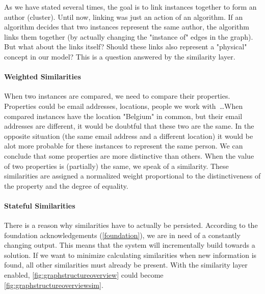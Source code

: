 As we have stated several times, the goal is to link instances together to form an author (cluster). Until now, linking was just an action of an algorithm. If an algorithm decides that two instances represent the same author, the algorithm links them together (by actually changing the "instance of" edges in the graph). But what about the links itself? Should these links also represent a "physical" concept in our model? This is a question answered by the similarity layer.

\paragraph{Weighted Similarities} When two instances are compared, we need to compare their properties. Properties could be email addresses, locations, people we work with~\ldots When compared instances have the location "Belgium" in common, but their email addresses are different, it would be doubtful that these two are the same. In the opposite situation (the same email address and a different location) it would be alot more probable for these instances to represent the same person. We can conclude that some properties are more distinctive than others. When the value of two properties is (partially) the same, we speak of a similarity. These similarities are assigned a normalized weight proportional to the distinctiveness of the property and the degree of equality.


\paragraph{Stateful Similarities} There is a reason why similarities have to actually be persisted. According to the foundation acknowledgements (\autoref{foundation}), we are in need of a constantly changing output. This means that the system will incrementally build towards a solution. If we want to minimize calculating similarities when new information is found, all other similarities must already be present. With the similarity layer enabled, \autoref{fig:graphstructureoverview} could become \autoref{fig:graphstructureoverviewsim}.

